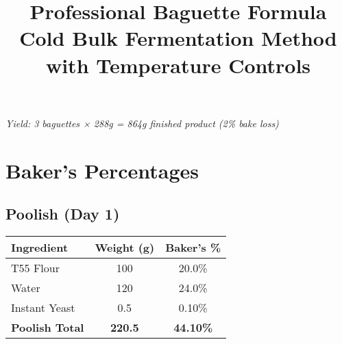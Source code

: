 \documentclass[10pt,a4paper]{article}
\begin{document}
    \title{\textcolor{headerblue}{\textbf{Professional Baguette Formula}}\\
    \large\textcolor{headerblue}{Cold Bulk Fermentation Method with Temperature Controls}}
    \author{}
    \date{}
    \maketitle

    \begin{center}
        \textit{Yield: 3 baguettes × 288g = 864g finished product (2\% bake loss)}
    \end{center}

    \section{Baker's Percentages}

    \subsection{Poolish (Day 1)}
    \begin{table}[h]
        \centering
        \begin{tabular}{@{}lcc@{}}
            \toprule
            \textbf{Ingredient}    & \textbf{Weight (g)} & \textbf{Baker's \%} \\
            \midrule
            T55 Flour              & 100                 & 20.0\%              \\
            Water                  & 120                 & 24.0\%              \\
            Instant Yeast          & 0.5                 & 0.10\%              \\
            \midrule
            \textbf{Poolish Total} & \textbf{220.5}      & \textbf{44.10\%}    \\
            \bottomrule
        \end{tabular}
    \end{table}
\end{document}
